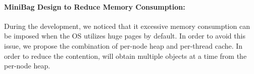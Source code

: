 \paragraph{MiniBag Design to Reduce Memory Consumption:} During the development, we noticed that it excessive memory consumption  can be imposed when the OS utilizes huge pages by default. In order to avoid this issue, we propose the combination of per-node heap and per-thread cache. In order to reduce the contention, \NM{} will obtain multiple objects at a time from the per-node heap. 



